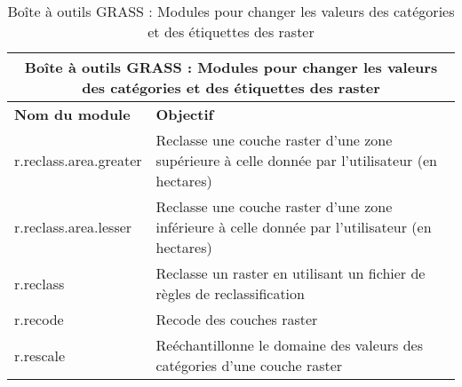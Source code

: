 \begin{table}[ht]
\centering
 \begin{tabular}{|p{4cm}|p{10cm}|}
  \hline \multicolumn{2}{|c|}{\textbf{Boîte à outils GRASS : Modules pour changer les valeurs des catégories et des étiquettes des raster}} \\  
  \hline \textbf{Nom du module} & \textbf{Objectif} \\
  \hline r.reclass.area.greater & Reclasse une couche raster d'une zone supérieure à celle donnée par l'utilisateur (en hectares) \\
  \hline r.reclass.area.lesser & Reclasse une couche raster d'une zone inférieure à celle donnée par l'utilisateur (en hectares) \\
  \hline r.reclass & Reclasse un raster en utilisant un fichier de règles de reclassification \\
  \hline r.recode & Recode des couches raster \\
  \hline r.rescale & Reéchantillonne le domaine des valeurs des catégories d'une couche raster \\
\hline
\end{tabular}
\caption{Boîte à outils GRASS : Modules pour changer les valeurs des catégories et des étiquettes des raster}
\end{table}

